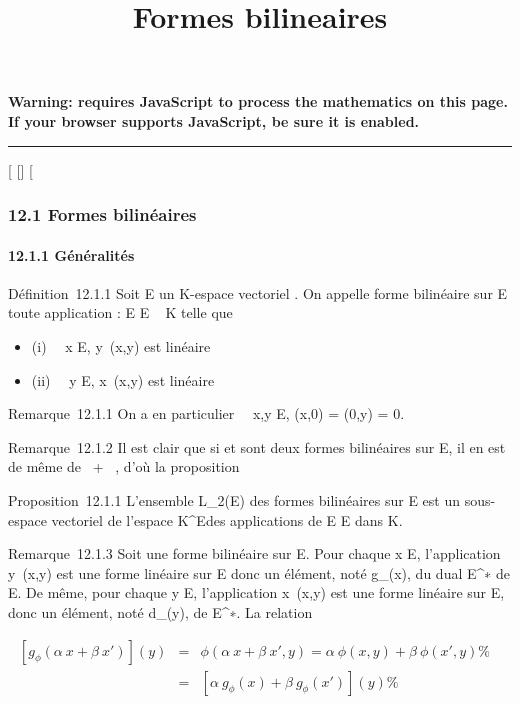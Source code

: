 \documentclass[]{article}
\title{Formes bilineaires}
\author{}
\date{}
\begin{document}
\maketitle

\textbf{Warning: 
requires JavaScript to process the mathematics on this page.\\ If your
browser supports JavaScript, be sure it is enabled.}

\begin{center}\rule{3in}{0.4pt}\end{center}

[
[]
[

\subsubsection{12.1 Formes bilinéaires}

\paragraph{12.1.1 Généralités}

Définition~12.1.1 Soit E un K-espace vectoriel . On appelle forme
bilinéaire sur E toute application \phi : E \times E \rightarrow~ K telle que

\begin{itemize}
\itemsep1pt\parskip0pt
\item
  (i) \forall~~x \in E,
  y\mapsto~\phi(x,y) est linéaire
\item
  (ii) \forall~~y \in E,
  x\mapsto~\phi(x,y) est linéaire
\end{itemize}

Remarque~12.1.1 On a en particulier \forall~~x,y \in E,
\phi(x,0) = \phi(0,y) = 0.

Remarque~12.1.2 Il est clair que si \phi et \psi sont deux formes bilinéaires
sur E, il en est de même de \alpha~\phi + \beta~\psi, d'où la proposition

Proposition~12.1.1 L'ensemble L_2(E) des formes bilinéaires sur
E est un sous-espace vectoriel de l'espace K^E\timesE des
applications de E \times E dans K.

Remarque~12.1.3 Soit \phi une forme bilinéaire sur E. Pour chaque x \in E,
l'application y\mapsto~\phi(x,y) est une forme linéaire
sur E donc un élément, noté g_\phi(x), du dual E^∗ de
E. De même, pour chaque y \in E, l'application
x\mapsto~\phi(x,y) est une forme linéaire sur E, donc
un élément, noté d_\phi(y), de E^∗. La relation

\begin{align*} \left
[g_\phi(\alpha~x + \beta~x')\right ](y)& =& \phi(\alpha~x +
\beta~x',y) = \alpha~\phi(x,y) + \beta~\phi(x',y)\%& \\ & =&
\left [\alpha~g_\phi(x) +
\beta~g_\phi(x')\right ](y) \%&
\\ \end{align*}
\end{document}
